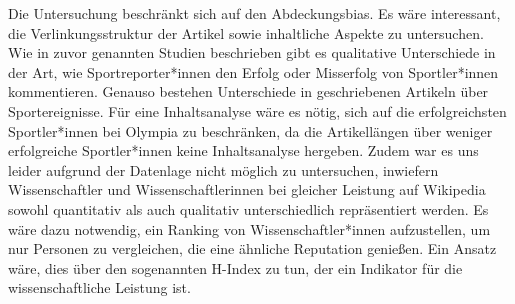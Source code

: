 \documentclass[11pt]{article}
\begin{document}
Die Untersuchung beschränkt sich auf den Abdeckungsbias. Es wäre interessant, die Verlinkungsstruktur der Artikel sowie inhaltliche Aspekte zu untersuchen. Wie in zuvor genannten Studien beschrieben gibt es qualitative Unterschiede in der Art, wie Sportreporter*innen den Erfolg oder Misserfolg von Sportler*innen kommentieren. Genauso bestehen Unterschiede in  geschriebenen Artikeln über Sportereignisse. Für eine Inhaltsanalyse wäre es nötig, sich auf die erfolgreichsten Sportler*innen bei Olympia zu beschränken, da die Artikellängen über weniger erfolgreiche Sportler*innen keine Inhaltsanalyse hergeben.
Zudem war es uns leider aufgrund der Datenlage nicht möglich zu untersuchen, inwiefern Wissenschaftler und Wissenschaftlerinnen bei gleicher Leistung auf Wikipedia sowohl quantitativ als auch qualitativ unterschiedlich repräsentiert werden. Es wäre dazu notwendig, ein Ranking von Wissenschaftler*innen aufzustellen, um nur Personen zu vergleichen, die eine ähnliche Reputation genießen. Ein Ansatz wäre, dies über den sogenannten H-Index zu tun, der ein Indikator für die wissenschaftliche Leistung ist\parencite{hIndex}.

\printbibliography
\end{document}
